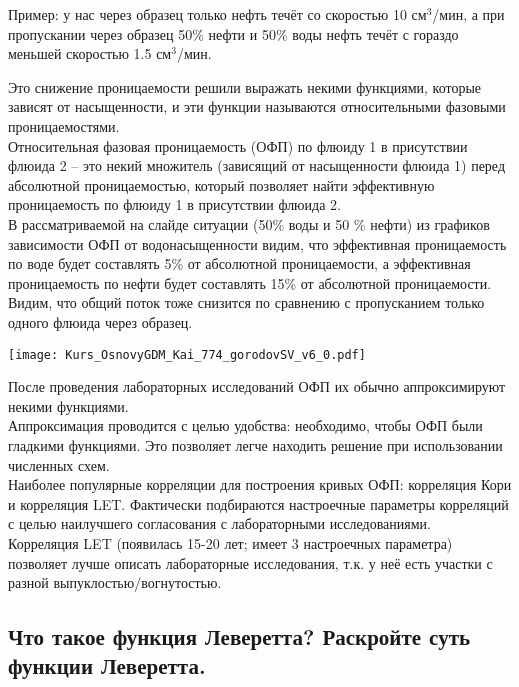 \documentclass[main.tex]{subfiles}
\begin{document}
Пример: у нас через образец только нефть течёт со скоростью 10 см$^3$/мин, а при пропускании через образец 50\% нефти и 50\% воды нефть течёт с гораздо меньшей скоростью 1.5 см$^3$/мин.

Это снижение проницаемости решили выражать некими функциями, которые зависят от насыщенности, и эти функции называются относительными фазовыми проницаемостями.
\\

Относительная фазовая проницаемость (ОФП) по флюиду 1 в присутствии флюида 2 -- это некий множитель (зависящий от насыщенности флюида 1) перед абсолютной проницаемостью, который позволяет найти эффективную проницаемость по флюиду 1 в присутствии флюида 2.
\\

В рассматриваемой на слайде ситуации (50\% воды и 50 \% нефти) из графиков зависимости ОФП от водонасыщенности видим, что эффективная проницаемость по воде будет составлять 5\% от абсолютной проницаемости, а эффективная проницаемость по нефти будет составлять 15\% от абсолютной проницаемости.
Видим, что общий поток тоже снизится по сравнению с пропусканием только одного флюида через образец.


\texttt{[image: Kurs\_OsnovyGDM\_Kai\_774\_gorodovSV\_v6\_0.pdf]}

После проведения лабораторных исследований ОФП их обычно аппроксимируют некими функциями.
\\

Аппроксимация проводится с целью удобства: необходимо, чтобы ОФП были гладкими функциями.
Это позволяет легче находить решение при использовании численных схем.
\\

Наиболее популярные корреляции для построения кривых ОФП: корреляция Кори и корреляция LET.
Фактически подбираются настроечные параметры корреляций с целью наилучшего согласования с лабораторными исследованиями.
\\

Корреляция LET (появилась 15-20 лет; имеет 3 настроечных параметра) позволяет лучше описать лабораторные исследования, т.к. у неё есть участки с разной выпуклостью/вогнутостью.

\newpage

\subsection{Что такое функция Леверетта? Раскройте суть функции Леверетта.}
\end{document}
